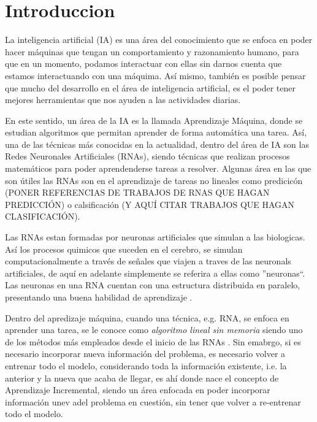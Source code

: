 \section{Introduccion}

La inteligencia artificial (IA) es una área del conocimiento que se enfoca en poder hacer máquinas que tengan un comportamiento y razonamiento humano, para que en un momento,  podamos interactuar con ellas sin darnos cuenta que estamos interactuando con una máquima. Así mismo,  también es posible pensar que mucho del desarrollo en el área de inteligencia artificial, es el poder tener mejores herramientas que nos ayuden a las actividades diarias. 

En este sentido, un área de la IA es la llamada Aprendizaje Máquina,  donde se estudian algoritmos que permitan aprender de forma automática una tarea. Así, una de las técnicas más conocidas en la actualidad, dentro del área de IA son las Redes Neuronales Artificiales (RNAs), siendo técnicas que realizan procesos matem\'aticos para poder aprendenderse tareas a resolver.  Algunas área en las que son útiles las RNAs son en el aprendizaje de tareas no lineales como predicicón (PONER REFERENCIAS DE TRABAJOS DE RNAS QUE HAGAN PREDICCIÓN) o calsificación (Y AQUÍ CITAR TRABAJOS QUE HAGAN CLASIFICACIÓN). 

Las RNAs estan formadas por neuronas artificiales que simulan a las biologicas. Así los procesos quimicos que suceden en el cerebro, se simulan computacionalmente a través de señales que viajen a traves de las neuronals artificiales, de aquí en adelante simplemente se referira a ellas como ''neuronas``. Las neuronas en una RNA cuentan con una estructura distribuida en paralelo, presentando una buena habilidad de aprendizaje \cite{Liu2015}.

Dentro del apredizaje máquina, cuando una técnica, e.g. RNA, se enfoca en aprender una tarea, se le conoce como \textit{algoritmo lineal sin memoria} siendo uno de los métodos más empleados desde el inicio de las RNAs \cite{GiraudCarrier2000}.  Sin emabrgo, si es necesario incorporar nueva información del problema,  es necesario volver a entrenar todo el modelo, considerando toda la información existente, i.e. la anterior y la nueva que acaba de llegar, es ahí donde nace el concepto de Aprendizaje Incremental, siendo un área enfocada en poder incorporar información unev adel problema en cuestión, sin tener que volver a re-entrenar todo el modelo.


